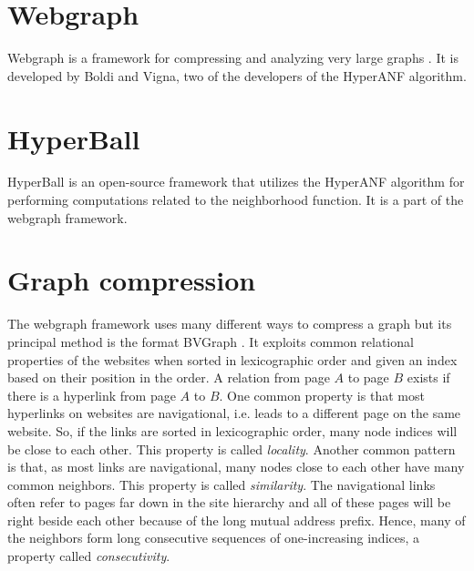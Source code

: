 \iffalse
\subsection{BroadWord}
Broadword is a way to do several calculations at the same time using cleverly constructed binary-logic expressions. HyperANF uses broadword to take the union $U$ of two HyperLogLog counters $A$ and $B$, which effectively is taking $\forall i; U_i = max(A_i,B_i)$
\fi

\section{Webgraph}
Webgraph is a framework for compressing and analyzing very large graphs \cite{webgraph}. It is developed by Boldi and Vigna, two of the developers of the HyperANF algorithm.


\section{HyperBall}
HyperBall is an open-source framework that utilizes the HyperANF algorithm for performing computations related to the neighborhood function. It is a part of the webgraph framework.

\section{Graph compression}
\label{sec:Compression}

The webgraph framework \cite{webgraph} uses many different ways to compress a graph but its principal method is the format BVGraph \cite{webgraph-compression}. It exploits common relational properties of the websites when sorted in lexicographic order and given an index based on their position in the order. A relation from page $A$ to page $B$ exists if there is a hyperlink from page $A$ to $B$. One common property is that most hyperlinks on websites are navigational, i.e. leads to a different page on the same website. So, if the links are sorted in lexicographic order, many node indices will be close to each other. This property is called \emph{locality}. Another common pattern is that, as most links are navigational, many nodes close to each other have many common neighbors. This property is called \emph{similarity}. The navigational links often refer to pages far down in the site hierarchy and all of these pages will be right beside each other because of the long mutual address prefix. Hence, many of the neighbors form long consecutive sequences of one-increasing indices, a property called \emph{consecutivity}.


